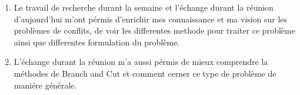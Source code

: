 \begin{enumerate}
    \item Le travail de recherche durant la semaine et l'échange durant la réunion d'aujourd'hui m'ont pérmis d'enrichir mes connaissance et ma vision sur les problèmes de conflits, de voir les differentes methode pour traiter ce problème ainsi que differentes formulation du problème.
    \item  L'échange durant la réunion m'a aussi pérmis de mieux comprendre la méthodes de Branch and Cut et comment cerner ce type de problème de maniére générale.   
\end{enumerate}